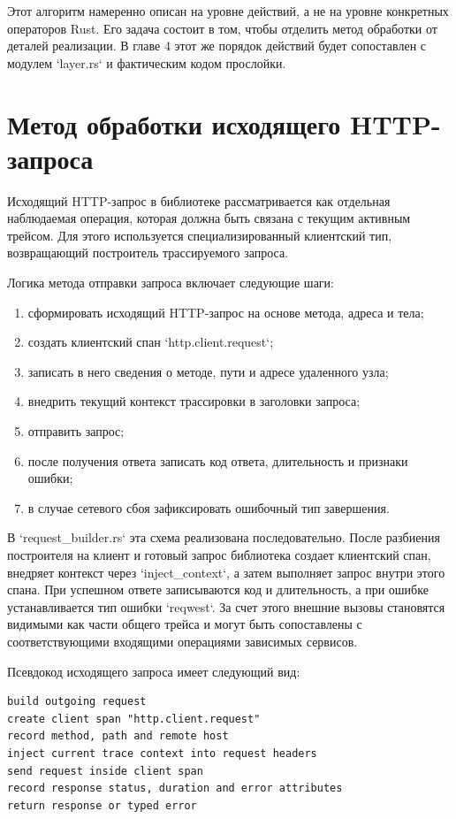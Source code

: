Этот алгоритм намеренно описан на уровне действий, а не на уровне конкретных
операторов Rust. Его задача состоит в том, чтобы отделить метод обработки от
деталей реализации. В главе 4 этот же порядок действий будет сопоставлен с
модулем `layer.rs` и фактическим кодом прослойки.

\section{Метод обработки исходящего HTTP-запроса}

Исходящий HTTP-запрос в библиотеке рассматривается как отдельная наблюдаемая
операция, которая должна быть связана с текущим активным трейсом. Для этого
используется специализированный клиентский тип, возвращающий построитель
трассируемого запроса.

Логика метода отправки запроса включает следующие шаги:
\begin{enumerate}
    \item сформировать исходящий HTTP-запрос на основе метода, адреса и тела;
    \item создать клиентский спан `http.client.request`;
    \item записать в него сведения о методе, пути и адресе удаленного узла;
    \item внедрить текущий контекст трассировки в заголовки запроса;
    \item отправить запрос;
    \item после получения ответа записать код ответа, длительность и признаки ошибки;
    \item в случае сетевого сбоя зафиксировать ошибочный тип завершения.
\end{enumerate}

В `request_builder.rs` эта схема реализована последовательно. После разбиения
построителя на клиент и готовый запрос библиотека создает клиентский спан,
внедряет контекст через `inject_context`, а затем выполняет запрос внутри этого
спана. При успешном ответе записываются код и длительность, а при ошибке
устанавливается тип ошибки `reqwest`. За счет этого внешние вызовы становятся
видимыми как части общего трейса и могут быть сопоставлены с соответствующими
входящими операциями зависимых сервисов.

Псевдокод исходящего запроса имеет следующий вид:

\begin{verbatim}
build outgoing request
create client span "http.client.request"
record method, path and remote host
inject current trace context into request headers
send request inside client span
record response status, duration and error attributes
return response or typed error
\end{verbatim}

